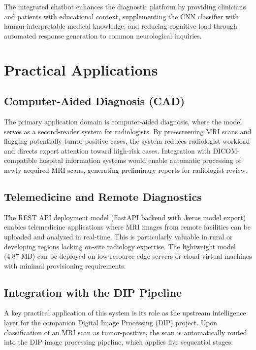 \documentclass[12pt,a4paper]{article}
\begin{document}
The integrated chatbot enhances the diagnostic platform by providing clinicians and patients with educational context, supplementing the CNN classifier with human-interpretable medical knowledge, and reducing cognitive load through automated response generation to common neurological inquiries.

\newpage

\section{Practical Applications}

\subsection{Computer-Aided Diagnosis (CAD)}

The primary application domain is computer-aided diagnosis, where the model serves as a second-reader system for radiologists. By pre-screening MRI scans and flagging potentially tumor-positive cases, the system reduces radiologist workload and directs expert attention toward high-risk cases. Integration with DICOM-compatible hospital information systems would enable automatic processing of newly acquired MRI scans, generating preliminary reports for radiologist review.

\subsection{Telemedicine and Remote Diagnostics}

The REST API deployment model (FastAPI backend with .keras model export) enables telemedicine applications where MRI images from remote facilities can be uploaded and analyzed in real-time. This is particularly valuable in rural or developing regions lacking on-site radiology expertise. The lightweight model (4.87 MB) can be deployed on low-resource edge servers or cloud virtual machines with minimal provisioning requirements.

\subsection{Integration with the DIP Pipeline}

A key practical application of this system is its role as the upstream intelligence layer for the companion Digital Image Processing (DIP) project. Upon classification of an MRI scan as tumor-positive, the scan is automatically routed into the DIP image processing pipeline, which applies five sequential stages:
\end{document}
